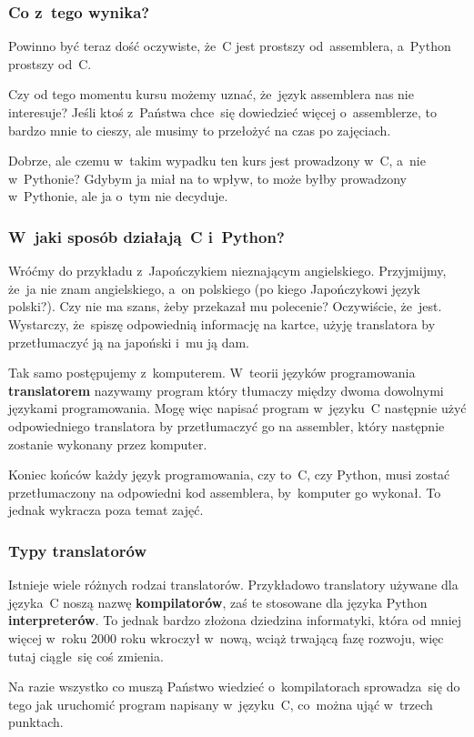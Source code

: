 \documentclass[10pt,t]{beamer}
\begin{document}
\begin{frame}
  \frametitle{Co z~tego wynika?}


  Powinno być teraz dość oczywiste, że~C jest prostszy od~assemblera,
  a~Python prostszy od~C.

  Czy od tego momentu kursu możemy uznać, że~język assemblera nas nie
  interesuje? Jeśli ktoś z~Państwa chce~się dowiedzieć więcej o~assemblerze,
  to bardzo mnie to cieszy, ale musimy to przełożyć na czas po zajęciach.

  Dobrze, ale czemu w~takim wypadku ten kurs jest prowadzony w~C, a~nie
  w~Pythonie? Gdybym ja miał na to wpływ, to może byłby prowadzony
  w~Pythonie, ale ja o~tym nie decyduje.

\end{frame}





\begin{frame}
  \frametitle{W~jaki sposób działają~C i~Python?}


  Wróćmy do przykładu z~Japończykiem nieznającym angielskiego. Przyjmijmy,
  że~ja nie znam angielskiego, a~on polskiego (po kiego Japończykowi język
  polski?). Czy nie ma szans, żeby przekazał mu polecenie? Oczywiście,
  że~jest. Wystarczy, że~spiszę odpowiednią informację na kartce, użyję
  translatora by przetłumaczyć ją na japoński i~mu ją dam.

  Tak samo postępujemy z~komputerem. W~teorii języków programowania
  \textbf{translatorem} nazywamy program który tłumaczy między dwoma
  \alert{dowolnymi} językami programowania. Mogę więc napisać program
  w~języku~C następnie użyć odpowiedniego translatora by przetłumaczyć
  go na assembler, który następnie zostanie wykonany przez komputer.

  Koniec końców każdy język programowania, czy to~C, czy Python,
  \alert{musi} zostać przetłumaczony na odpowiedni kod assemblera,
  by~komputer go wykonał. To jednak wykracza poza temat zajęć.

\end{frame}





\begin{frame}
  \frametitle{Typy translatorów}


  Istnieje wiele różnych rodzai translatorów. Przykładowo translatory
  używane dla języka~C noszą nazwę \textbf{kompilatorów}, zaś te stosowane
  dla języka Python \textbf{interpreterów}. To jednak bardzo złożona
  dziedzina informatyki, która od mniej więcej w~roku 2000 roku wkroczył
  w~nową, wciąż trwającą fazę rozwoju, więc tutaj ciągle~się coś zmienia.

  Na razie wszystko co muszą Państwo wiedzieć o~kompilatorach sprowadza~się
  do tego jak uruchomić program napisany w~języku~C, co~można ująć w~trzech
  punktach.

\end{frame}
\end{document}
